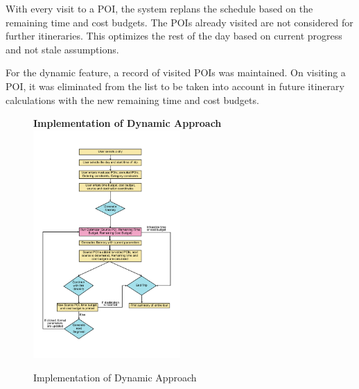 With every visit to a POI, the system replans the schedule based on the remaining time and cost budgets. The POIs already visited are not considered for further itineraries. This optimizes the rest of the day based on current progress and not stale assumptions.

For the dynamic feature, a record of visited POIs was maintained. On visiting a POI, it was eliminated from the list to be taken into account in future itinerary calculations with the new remaining time and cost budgets.

\begin{figure}[th]
\textbf{Implementation of Dynamic Approach}
\centering
\includegraphics[width=0.5\textwidth]{binary dynamic flowchart.png}
\caption{Implementation of Dynamic Approach}
\label{fig:flowchart_dynamic}
\end{figure}
